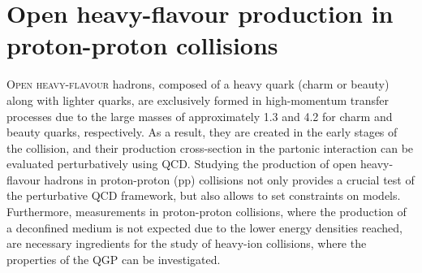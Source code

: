 \chapter{Open heavy-flavour production in proton-proton collisions}

\lettrine[lines=6,findent=0.pt]{O}{pen heavy-flavour} hadrons, composed of a heavy quark (charm or beauty) along with lighter quarks, are exclusively formed in high-momentum transfer processes due to the large masses of approximately 1.3 \gevcc and 4.2 \gevcc for charm and beauty quarks, respectively. As a result, they are created in the early stages of the collision, and their production cross-section in the partonic interaction can be evaluated perturbatively using QCD. Studying the production of open heavy-flavour hadrons in proton-proton (pp) collisions not only provides a crucial test of the perturbative QCD framework, but also allows to set constraints on models. Furthermore, measurements in proton-proton collisions, where the production of a deconfined medium is not expected due to the lower energy densities reached, are necessary ingredients for the study of heavy-ion collisions, where the properties of the QGP can be investigated. 

